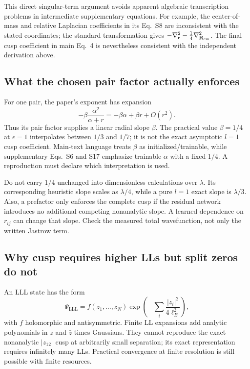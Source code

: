 \documentclass[11pt,letterpaper]{article}
\newcommand{\rr}{\mathbf r}
\newcommand{\LLL}{\mathrm{LLL}}
\begin{document}
This direct singular-term argument avoids apparent algebraic transcription problems in intermediate supplementary equations. For example, the center-of-mass and relative Laplacian coefficients in its Eq.~S8 are inconsistent with the stated coordinates; the standard transformation gives $-\nabla_{\rr}^2-\frac14\nabla_{\mathbf R_{\rm cm}}^2$. The final cusp coefficient in main Eq.~4 is nevertheless consistent with the independent derivation above.

\subsection{What the chosen pair factor actually enforces}

For one pair, the paper's exponent has expansion
\begin{equation}
 -\beta\frac{\alpha^2}{\alpha+r}=-\beta\alpha+\beta r+O(r^2).
\end{equation}
Thus its pair factor supplies a linear radial slope $\beta$. The practical value $\beta=1/4$ at $\epsilon=1$ interpolates between $1/3$ and $1/7$; it is not the exact asymptotic $l=1$ cusp coefficient. Main-text language treats $\beta$ as initialized/trainable, while supplementary Eqs.~S6 and S17 emphasize trainable $\alpha$ with a fixed $1/4$. A reproduction must declare which interpretation is used.

Do not carry $1/4$ unchanged into dimensionless calculations over $\lambda$. Its corresponding heuristic slope scales as $\lambda/4$, while a pure $l=1$ exact slope is $\lambda/3$. Also, a prefactor only enforces the complete cusp if the residual network introduces no additional competing nonanalytic slope. A learned dependence on $r_{ij}$ can change that slope. Check the measured total wavefunction, not only the written Jastrow term.

\subsection{Why cusp requires higher LLs but split zeros do not}

An LLL state has the form
\begin{equation}
 \Psi_{\LLL}=f(z_1,\ldots,z_N)\exp\left(-\sum_i\frac{|z_i|^2}{4\ell_B^2}\right),
\end{equation}
with $f$ holomorphic and antisymmetric. Finite LL expansions add analytic polynomials in $z$ and $\bar z$ times Gaussians. They cannot reproduce the exact nonanalytic $|z_{12}|$ cusp at arbitrarily small separation; its exact representation requires infinitely many LLs. Practical convergence at finite resolution is still possible with finite resources.
\end{document}
